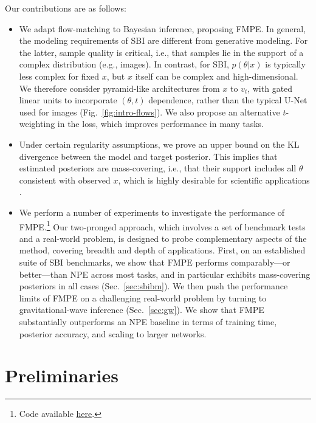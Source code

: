 \documentclass{article}
\theoremstyle{remark}
\begin{document}
Our contributions are as follows:
\begin{itemize}
\item We adapt flow-matching to Bayesian inference, proposing FMPE. In general, the modeling requirements of SBI are different from generative modeling. For the latter, sample quality is critical, i.e., that samples lie in the support of a complex distribution (e.g., images). In contrast, for SBI, $p(\theta|x)$ is typically less complex for fixed $x$, but $x$ itself can be complex and high-dimensional. We therefore consider pyramid-like architectures from $x$ to $v_t$, with gated linear units to incorporate $(\theta, t)$ dependence, rather than the typical U-Net used for images (Fig.~\ref{fig:intro-flows}). We also propose an alternative $t$-weighting in the loss, which improves performance in many tasks. 

\item Under certain regularity assumptions, we prove an upper bound on the KL divergence between the model and target posterior. This implies that estimated posteriors are mass-covering, i.e., that their support includes all $\theta$ consistent with observed $x$, which is highly desirable for scientific applications \cite{hermans2021averting}.

\item We perform a number of experiments to investigate the performance of FMPE.\footnote{Code available \href{https://github.com/dingo-gw/flow-matching-posterior-estimation}{here}.} Our two-pronged approach, which involves a set of benchmark tests and a real-world problem, is designed to probe complementary aspects of the method, covering breadth and depth of applications. First, on an established suite of SBI benchmarks, we show that FMPE performs comparably---or better---than NPE across most tasks, and in particular exhibits mass-covering posteriors in all cases (Sec.~\ref{sec:sbibm}). We then push the performance limits of FMPE on a challenging real-world problem by turning to gravitational-wave inference (Sec.~\ref{sec:gw}). We show that FMPE substantially outperforms an NPE baseline in terms of training time, posterior accuracy, and scaling to larger networks. 
\end{itemize}

\section{Preliminaries}
\label{sec:preliminaries}
\end{document}
